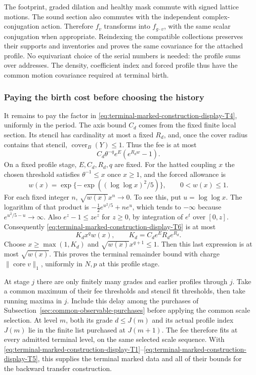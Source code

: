 The footprint, graded dilation and healthy mask commute with signed
lattice motions. The sound section also commutes with the independent
complex-conjugation action. Therefore $f_v$ transforms into
$f_{g\cdot v}$, with the same scalar conjugation when appropriate.
Reindexing the compatible collections preserves their supports and
inventories and proves the same covariance for the attached profile.
No equivariant choice of the serial numbers is needed: the profile
sums over addresses. The density, coefficient index and forced profile
thus have the common motion covariance required at terminal birth.

\subsubsection{Paying the birth cost before choosing the history}
It remains to pay the factor in \eqref{eq:terminal-marked-construction-display-T4}, uniformly in the period. The
axis bound $C_d$ comes from the fixed finite local section. Its stencil
has cardinality at most a fixed $R_d$, and, once the cover radius
contains that stencil, $\operatorname{cover}_B(Y)\le1$. Thus the fee is
at most
\begin{equation}
 C_d\theta^{-q}e^E(e^{R_dw}-1).
 \label{eq:terminal-marked-construction-display-T6}
\end{equation}
On a fixed profile stage, $E,C_d,R_d,q$ are fixed. For the hatted
coupling $x$ the chosen threshold satisfies $\theta^{-1}\le x$ once
$x\ge1$, and the forced allowance is
\[
 w(x)=\exp\{-\exp((\log\log x)^2/5)\},\qquad 0<w(x)\le1.
\]
For each fixed integer $n$, $\sqrt{w(x)}x^n\to0$. To see this, put
$u=\log\log x$. The logarithm of that product is
$-\tfrac12e^{u^2/5}+ne^u$, which tends to $-\infty$ because
$e^{u^2/5-u}\to\infty$. Also
$e^z-1\le ze^z$ for $z\ge0$, by integration of $e^t$ over $[0,z]$.
Consequently \eqref{eq:terminal-marked-construction-display-T6} is at most
\[
 K_dx^qw(x),\qquad K_d=C_de^ER_de^{R_d}.
\]
Choose $x\ge\max(1,K_d)$ and
$\sqrt{w(x)}x^{q+1}\le1$. Then this last expression is at most
$\sqrt{w(x)}$. This proves the terminal remainder bound with charge
$\|\operatorname{core}v\|_1$, uniformly in $N,p$ at this profile stage.

At stage $j$ there are only finitely many grades and earlier profiles
through $j$. Take a common maximum of their fee thresholds and stencil
fit thresholds, then take running maxima in $j$. Include this delay
among the purchases of Subsection~\ref{sec:common-observable-purchases}
before applying the common scale selection. At level $m$, both its
grade $d\le J(m)$ and its actual profile index $J(m)$ lie in the
finite list purchased at $J(m+1)$. The fee therefore fits at every
admitted terminal level, on the same selected scale sequence. With
\eqref{eq:terminal-marked-construction-display-T1}--\eqref{eq:terminal-marked-construction-display-T5}, this supplies the terminal marked data and all of their
bounds for the backward transfer construction.

